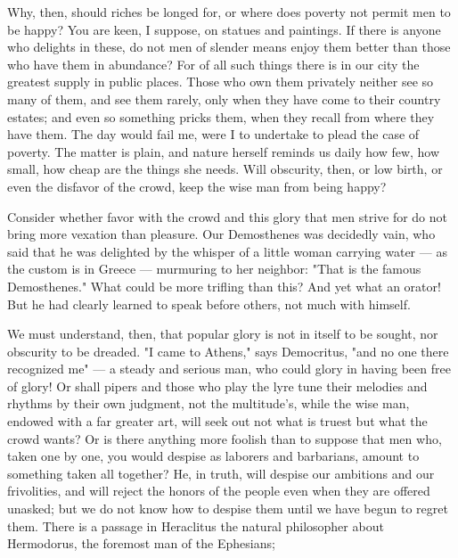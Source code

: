  Why, then, should riches be longed for, or where does poverty not permit men to be happy? You are keen, I suppose, on statues and paintings. If there is anyone who delights in these, do not men of slender means enjoy them better than those who have them in abundance? For of all such things there is in our city the greatest supply in public places. Those who own them privately neither see so many of them, and see them rarely, only when they have come to their country estates; and even so something pricks them, when they recall from where they have them. The day would fail me, were I to undertake to plead the case of poverty. The matter is plain, and nature herself reminds us daily how few, how small, how cheap are the things she needs. Will obscurity, then, or low birth, or even the disfavor of the crowd, keep the wise man from being happy?

 Consider whether favor with the crowd and this glory that men strive for do not bring more vexation than pleasure. Our Demosthenes was decidedly vain, who said that he was delighted by the whisper of a little woman carrying water — as the custom is in Greece — murmuring to her neighbor: "That is the famous Demosthenes." What could be more trifling than this? And yet what an orator! But he had clearly learned to speak before others, not much with himself.

 We must understand, then, that popular glory is not in itself to be sought, nor obscurity to be dreaded. "I came to Athens," says Democritus, "and no one there recognized me" — a steady and serious man, who could glory in having been free of glory! Or shall pipers and those who play the lyre tune their melodies and rhythms by their own judgment, not the multitude's, while the wise man, endowed with a far greater art, will seek out not what is truest but what the crowd wants? Or is there anything more foolish than to suppose that men who, taken one by one, you would despise as laborers and barbarians, amount to something taken all together? He, in truth, will despise our ambitions and our frivolities, and will reject the honors of the people even when they are offered unasked; but we do not know how to despise them until we have begun to regret them. There is a passage in Heraclitus the natural philosopher about Hermodorus, the foremost man of the Ephesians;

